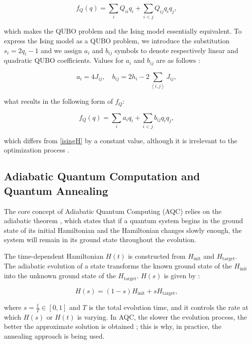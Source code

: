 \documentclass[a4paper,12pt]{article}
\begin{document}
\begin{equation}
    f_Q(q)=\sum _iQ_{ii}q_i+\sum _{i<j}Q_{ij}q_iq_j,
\end{equation}

\noindent which makes the QUBO problem and the Ising model essentially equivalent. To express the Ising model as a QUBO problem, we introduce the substitution $s_i=2q_i-1$ and we assign $a_i$ and $b_{ij}$ symbols to denote respectively linear and quadratic QUBO coefficients. Values for $a_i$ and $b_{ij}$ are as follows \cite{Jałowiecki2023}:

\begin{equation}\label{a_and_b_qubo}
    a_i = 4J_{ij}, \quad b_{ij} = 2h_i - 2\sum_{\left\langle i\right.,\left.j\right\rangle}J_{ij},
\end{equation}

\noindent what results in the following form of $f_Q$:

\begin{equation}
f_Q(q)=\sum _ia_iq_i+\sum _{i<j}b_{ij}q_iq_j,
\end{equation}

\noindent which differs from \eqref{isingH} by a constant value, although it is irrelevant to the optimization process \cite{Jałowiecki2023}.

\subsection{Adiabatic Quantum Computation and Quantum Annealing}\label{aqc_qa_section}

The core concept of Adiabatic Quantum Computing (AQC) relies on the adiabatic theorem \cite{Farhi2000}, which states that if a quantum system begins in the ground state of its initial Hamiltonian and the Hamiltonian changes slowly enough, the system will remain in its ground state throughout the evolution. 

The time-dependent Hamiltonian $H(t)$ is constructed from  $H_{\mathrm{init}}$ and $H_{\mathrm{target}}$. The adiabatic evolution of a state transforms the known ground state of the $H_{\mathrm{init}}$ into the unknown ground state of the $H_{\mathrm{target}}$. $H(s)$ is given by \cite{Kumar2018, Głomb2023}:

\begin{equation}\label{H(s)}
    H(s) = (1 - s) H_{\mathrm{init}} + s H_{\mathrm{target}},
\end{equation}

\noindent where $s=\frac{t}{T} \in [0, 1]$ and $T$ is the total evolution time, and it controls the rate at which $H(s)$ or $H(t)$ is varying. In AQC, the slower the evolution process, the better the approximate solution is obtained \cite{Calude2015}; this is why, in practice, the annealing approach is being used.
\end{document}
